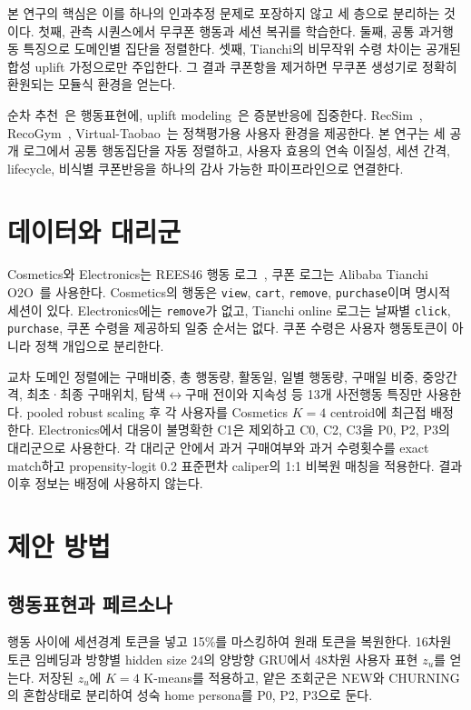 \documentclass[9pt,twocolumn]{extarticle}
\begin{document}
본 연구의 핵심은 이를 하나의 인과추정 문제로 포장하지 않고 세 층으로 분리하는
것이다. 첫째, 관측 시퀀스에서 무쿠폰 행동과 세션 복귀를 학습한다. 둘째, 공통
과거행동 특징으로 도메인별 집단을 정렬한다. 셋째, Tianchi의 비무작위 수령 차이는
공개된 합성 uplift 가정으로만 주입한다. 그 결과 쿠폰항을 제거하면 무쿠폰 생성기로
정확히 환원되는 모듈식 환경을 얻는다.

순차 추천~\cite{sun2019}은 행동표현에, uplift modeling~\cite{devriendt2018}은
증분반응에 집중한다. RecSim~\cite{ie2019}, RecoGym~\cite{rohde2018},
Virtual-Taobao~\cite{shi2019}는 정책평가용 사용자 환경을 제공한다. 본 연구는 세
공개 로그에서 공통 행동집단을 자동 정렬하고, 사용자 효용의 연속 이질성, 세션
간격, lifecycle, 비식별 쿠폰반응을 하나의 감사 가능한 파이프라인으로 연결한다.

\section{데이터와 대리군}
Cosmetics와 Electronics는 REES46 행동 로그~\cite{rees46}, 쿠폰 로그는 Alibaba
Tianchi O2O~\cite{tianchi}를 사용한다. Cosmetics의 행동은 \texttt{view},
\texttt{cart}, \texttt{remove}, \texttt{purchase}이며 명시적 세션이 있다.
Electronics에는 \texttt{remove}가 없고, Tianchi online 로그는 날짜별
\texttt{click}, \texttt{purchase}, 쿠폰 수령을 제공하되 일중 순서는 없다. 쿠폰
수령은 사용자 행동토큰이 아니라 정책 개입으로 분리한다.

교차 도메인 정렬에는 구매비중, 총 행동량, 활동일, 일별 행동량, 구매일 비중,
중앙간격, 최초·최종 구매위치, 탐색$\leftrightarrow$구매 전이와 지속성 등 13개
사전행동 특징만 사용한다. pooled robust scaling 후 각 사용자를 Cosmetics $K=4$
centroid에 최근접 배정한다. Electronics에서 대응이 불명확한 C1은 제외하고 C0,
C2, C3을 P0, P2, P3의 대리군으로 사용한다. 각 대리군 안에서 과거 구매여부와
과거 수령횟수를 exact match하고 propensity-logit 0.2 표준편차 caliper의 1:1
비복원 매칭을 적용한다. 결과 이후 정보는 배정에 사용하지 않는다.

\section{제안 방법}
\subsection{행동표현과 페르소나}
행동 사이에 세션경계 토큰을 넣고 15\%를 마스킹하여 원래 토큰을 복원한다.
16차원 토큰 임베딩과 방향별 hidden size 24의 양방향 GRU에서 48차원 사용자
표현 $z_u$를 얻는다. 저장된 $z_u$에 $K=4$ K-means를 적용하고, 얕은 조회군은
NEW와 CHURNING의 혼합상태로 분리하여 성숙 home persona를 P0, P2, P3으로 둔다.
\end{document}
